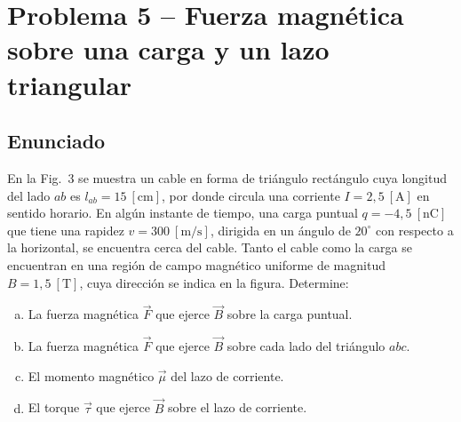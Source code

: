 \documentclass[12pt,letterpaper]{article}
\begin{document}
\section*{Problema 5 -- Fuerza magn\'etica sobre una carga y un lazo triangular}

\subsection*{Enunciado}

En la Fig.~3 se muestra un cable en forma de tri\'angulo rect\'angulo cuya longitud del lado $ab$ es
$l_{ab} = 15\ [\text{cm}]$, por donde circula una corriente $I = 2{,}5\ [\text{A}]$ en sentido
horario. En alg\'un instante de tiempo, una carga puntual $q = -4{,}5\ [\text{nC}]$ que tiene una
rapidez $v = 300\ [\text{m/s}]$, dirigida en un \'angulo de $20^\circ$ con respecto a la horizontal, se
encuentra cerca del cable. Tanto el cable como la carga se encuentran en una regi\'on de campo
magn\'etico uniforme de magnitud $B = 1{,}5\ [\text{T}]$, cuya direcci\'on se indica en la figura.
Determine:
\begin{enumerate}[(a)]
    \item La fuerza magn\'etica $\vec{F}$ que ejerce $\vec{B}$ sobre la carga puntual.
    \item La fuerza magn\'etica $\vec{F}$ que ejerce $\vec{B}$ sobre cada lado del tri\'angulo $abc$.
    \item El momento magn\'etico $\vec{\mu}$ del lazo de corriente.
    \item El torque $\vec{\tau}$ que ejerce $\vec{B}$ sobre el lazo de corriente.
\end{enumerate}
\end{document}
